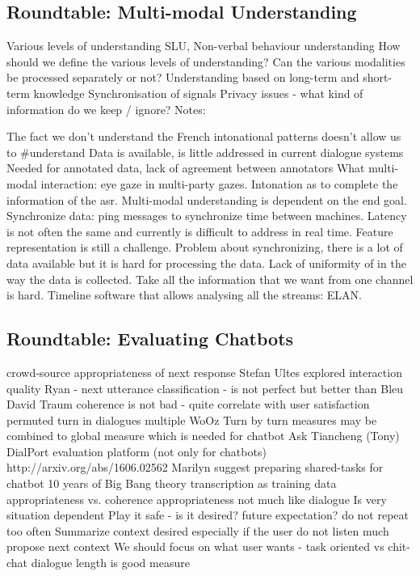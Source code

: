 \documentclass[12pt]{article}
\begin{document}
\subsection{Roundtable: Multi-modal Understanding}

Various levels of understanding
SLU, Non-verbal behaviour understanding
How should we define the various levels of understanding?
Can the various modalities be processed separately or not?
Understanding based on long-term and short-term knowledge
Synchronisation of signals
Privacy issues - what kind of information do we keep / ignore?
Notes:

The fact we don’t understand the French intonational patterns doesn’t allow us to #understand
Data is available, is little addressed in current dialogue systems
Needed for annotated data, lack of agreement between annotators
What multi-modal interaction: eye gaze in multi-party gazes.
Intonation as to complete the information of the asr.
Multi-modal understanding is dependent on the end goal.
Synchronize data: ping messages to synchronize time between machines. Latency is not often the same and currently is difficult to address in real time.
Feature representation is still a challenge.
Problem about synchronizing, there is a lot of data available but it is hard for processing the data. Lack of uniformity of in the way the data is collected. Take all the information that we want from one channel is hard. Timeline software that allows analysing all the streams: ELAN.

\subsection{Roundtable: Evaluating Chatbots}

crowd-source appropriateness of next response
Stefan Ultes explored interaction quality
Ryan - next utterance classification - is not perfect but better than Bleu
David Traum
coherence is not bad - quite correlate with user satisfaction
 permuted turn in dialogues
 multiple WoOz
Turn by turn measures
 may be combined to global measure which is needed for chatbot
Ask Tiancheng (Tony)
DialPort evaluation platform (not only for chatbots) http://arxiv.org/abs/1606.02562
Marilyn suggest preparing shared-tasks for chatbot
10 years of Big Bang theory transcription as training data
appropriateness vs. coherence
appropriateness
not much like dialogue
Is very situation dependent
Play it safe - is it desired?
future expectation?
do not repeat too often
Summarize context
desired especially if the user do not listen much
propose next context
We should focus on what user wants - task oriented vs chit-chat
dialogue length is good measure
\end{document}
